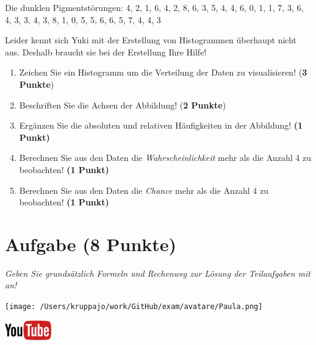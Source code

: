 \documentclass[a4paper, 9pt]{scrartcl}\usepackage[]{graphicx}\usepackage[]{xcolor}
\begin{document}
\begin{center}
Die dunklen Pigmentstörungen: 4, 2, 1, 6, 4, 2, 8, 6, 3, 5, 4, 4, 6, 0, 1, 1, 7, 3, 6, 4, 3, 3, 4, 3, 8, 1, 0, 5, 5, 6, 6, 5, 7, 4, 4, 3
\end{center}

Leider kennt sich Yuki mit der Erstellung von Histogrammen überhaupt nicht aus. Deshalb braucht sie bei der Erstellung Ihre Hilfe!

\begin{enumerate}
\item Zeichen Sie ein Histogramm um die Verteilung der Daten zu visualisieren! (\textbf{3 Punkte})
\item Beschriften Sie die Achsen der Abbildung! (\textbf{2 Punkte})
\item Ergänzen Sie die absoluten und relativen Häufigkeiten in der
  Abbildung! \textbf{(1 Punkt)}
\item Berechnen Sie aus den Daten die \textit{Wahrscheinlichkeit}
  mehr als die Anzahl 4 zu beobachten! \textbf{(1
    Punkt)}
\item Berechnen Sie aus den Daten die \textit{Chance} mehr
  als die Anzahl 4 zu beobachten! \textbf{(1 Punkt)}
\end{enumerate}

 
\clearpage

\section{Aufgabe \hfill (8 Punkte)}

\textit{Geben Sie grundsätzlich Formeln und Rechenweg zur Lösung der Teilaufgaben mit an!} \\[1Ex]
 

 
\begin{minipage}[t]{0.5\textwidth}
\texttt{[image: /Users/kruppajo/work/GitHub/exam/avatare/Paula.png]}
\end{minipage}
\begin{minipage}[t]{0.5\textwidth}
\hfill
\href{https://youtu.be/ORHSPTCdfeY}{\includegraphics[width = 2cm]{img/youtube}}\\[1Ex]
\end{minipage}
\vspace{1ex}
\end{document}

